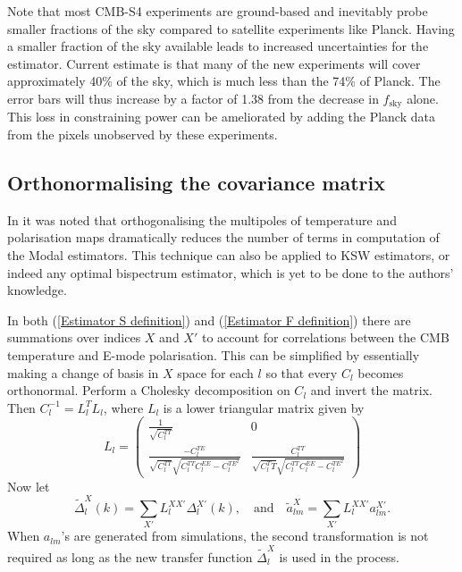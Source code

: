 Note that most CMB-S4 experiments are ground-based and inevitably probe smaller fractions of the sky compared to satellite experiments like Planck. Having a smaller fraction of the sky available leads to increased uncertainties for the estimator. Current estimate is that many of the new experiments will cover approximately 40\% of the sky, which is much less than the 74\% of Planck. The error bars will thus increase by a factor of 1.38 from the decrease in $f_\text{sky}$ alone.  This loss in constraining power can be ameliorated by adding the Planck data from the pixels unobserved by these experiments.

\subsection{Orthonormalising the covariance matrix}

In \cite{Fergusson2014} it was noted that orthogonalising the multipoles of temperature and polarisation maps dramatically reduces the number of terms in computation of the Modal estimators. This technique can also be applied to KSW estimators, or indeed any optimal bispectrum estimator, which is yet to be done to the authors' knowledge.

In both (\ref{Estimator S definition}) and (\ref{Estimator F definition}) there are summations over indices $X$ and $X'$ to account for correlations between the CMB temperature and E-mode polarisation. This can be simplified by essentially making a change of basis in $X$ space for each $l$ so that every $C_l$ becomes orthonormal. Perform a Cholesky decomposition on $C_l$ and invert the matrix. Then $C_l^{-1} = L_l^T L_l$, where $L_l$ is a lower triangular matrix given by
\begin{equation}
	L_l = \begin{pmatrix} \frac{1}{\sqrt{C_l^{TT}}} & 0  \\ \frac{- C_l^{TE}}{\sqrt{C_l^{TT}} \sqrt{C_l^{TT} C_l^{EE} - C_l^{TE^2}}}  &  \frac{ C_l^{TT}}{\sqrt{C_l^TT} \sqrt{C_l^{TT} C_l^{EE} - C_l^{TE^2}}} \end{pmatrix}
\end{equation}
Now let
\begin{equation}
	\tilde{\Delta}_{l}^X (k) = \sum_{X'} L_l^{XX'} \Delta_{l}^{X'} (k), \quad\text{and}\quad \tilde{a}_{lm}^X = \sum_{X'} L_l^{XX'} a_{lm}^{X'}.
	\label{orthonormalisation}
\end{equation}
When $a_{lm}$'s are generated from simulations, the second transformation is not required as long as the new transfer function $\tilde{\Delta}_l^X$ is used in the process.

